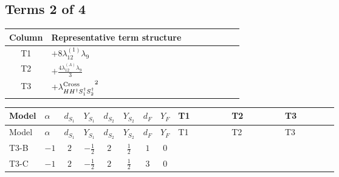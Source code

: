 \documentclass[8pt]{article}
\begin{document}
\begin{landscape}
\subsection*{Terms 2 of 4}
\begin{center}
\begin{tabular}{@{}c >{\raggedright\arraybackslash}p{0.82\linewidth}@{}}
\toprule
Column & Representative term structure \\
\midrule
T1 & \(\displaystyle +8 {\lambda_{12}^{(1)}} {\lambda_9}\) \\
\midrule
T2 & \(\displaystyle +\frac{4 {\lambda_{12}^{(A)}} {\lambda_9}}{3}\) \\
\midrule
T3 & \(\displaystyle +{\lambda_{H H^\dagger S_1^\dagger S_2^\dagger}^{\rm Cross}}^2\) \\
\midrule
\bottomrule
\end{tabular}
\end{center}
\smallskip
\tiny
\begin{longtable}{@{}llcccccc >{\raggedright\arraybackslash}p{0.21\linewidth} >{\raggedright\arraybackslash}p{0.21\linewidth} >{\raggedright\arraybackslash}p{0.21\linewidth}@{}}
\toprule
Model & $\alpha$ & $d_{S_1}$ & $Y_{S_1}$ & $d_{S_2}$ & $Y_{S_2}$ & $d_F$ & $Y_F$ & T1 & T2 & T3 \\
\midrule
\endfirsthead
\toprule
Model & $\alpha$ & $d_{S_1}$ & $Y_{S_1}$ & $d_{S_2}$ & $Y_{S_2}$ & $d_F$ & $Y_F$ & T1 & T2 & T3 \\
\midrule
\endhead
T3-B & $-1$ & $2$ & $-\frac{1}{2}$ & $2$ & $\frac{1}{2}$ & $1$ & $0$ & \scriptsize\adjustbox{max width=\linewidth}{$\begin{gathered} +8 {\lambda_{12}^{(1)}} {\lambda_9}\end{gathered}$} & \scriptsize\adjustbox{max width=\linewidth}{$\begin{gathered} +\frac{4 {\lambda_{12}^{(A)}} {\lambda_9}}{3}\end{gathered}$} & \scriptsize\adjustbox{max width=\linewidth}{$\begin{gathered} +{\lambda_{H H^\dagger S_1^\dagger S_2^\dagger}^{\rm Cross}}^2\end{gathered}$} \\
\midrule
T3-C & $-1$ & $2$ & $-\frac{1}{2}$ & $2$ & $\frac{1}{2}$ & $3$ & $0$ & \scriptsize\adjustbox{max width=\linewidth}{$\begin{gathered} +8 {\lambda_{12}^{(1)}} {\lambda_9}\end{gathered}$} & \scriptsize\adjustbox{max width=\linewidth}{$\begin{gathered} +\frac{4 {\lambda_{12}^{(A)}} {\lambda_9}}{3}\end{gathered}$} & \scriptsize\adjustbox{max width=\linewidth}{$\begin{gathered} +{\lambda_{H H^\dagger S_1^\dagger S_2^\dagger}^{\rm Cross}}^2\end{gathered}$} \\

\end{longtable}
\end{landscape}
\end{document}
